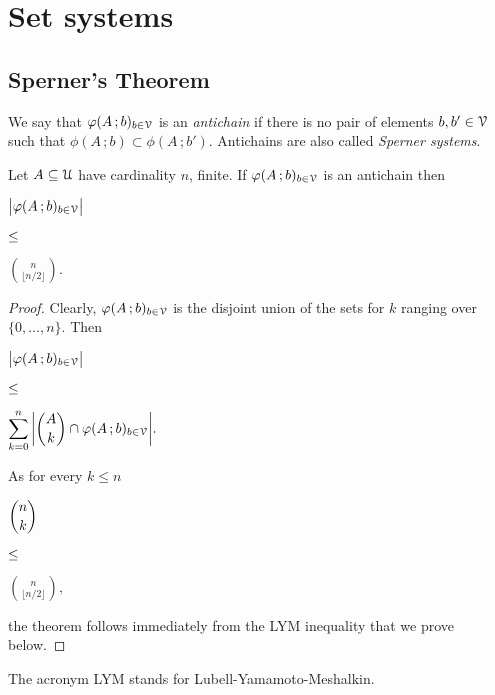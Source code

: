 \documentclass[scombinatorics.tex]{subfiles}
\begin{document}
\chapter{Set systems}
\label{sperner}



\def\medrel#1{\parbox[t]{6ex}{$\displaystyle\hfil #1$}}
\def\ceq#1#2#3{\parbox[t]{40ex}{$\displaystyle #1$}\medrel{#2}{$\displaystyle #3$}}

\def\separatore{\hfil o \rule[0.5ex]{4ex}{0.1ex} o \rule[0.5ex]{4ex}{0.1ex} o}


\section{Sperner's Theorem}\label{sperner}

We say that $\varphi(A\,;b)_{b\in\EuScript V}$ is an \emph{antichain\/} if there is no pair of elements $b,b'\in\EuScript V$ such that $\phi(A\,;b)\subset\phi(A\,;b')$.
Antichains are also called \emph{Sperner systems}.

\def\ceq#1#2#3{\parbox[t]{36ex}{$\displaystyle #1$}\medrel{#2}{$\displaystyle #3$}}

\begin{void_thm}
   Let $A\subseteq\EuScript U$ have cardinality $n$, finite.
   If $\varphi(A\,;b)_{b\in\EuScript V}$ is an antichain then
   
   \ceq{\hfill\big|\phi(A\,;b)_{b\in\V}\big|}{\le}{{n\choose\lfloor n/2\rfloor}.}
\end{void_thm}
\smallskip
\begin{proof}
   Clearly, $\varphi(A\,;b)_{b\in\EuScript V}$ is the disjoint union of the sets  for $k$ ranging over $\{0,\dots,n\}$.
   Then 

   \ceq{\hfill\big|\phi(A\,;b)_{b\in\V}\big|}{\le}{\sum^n_{k=0}\bigg|{A\choose k}\cap\phi(A\,;b)_{b\in\V}\bigg|.}

   As for every $k\le n$
   
   \ceq{\hfill{n\choose k}}{\le}{{n\choose\lfloor n/2\rfloor},}

   the theorem follows immediately from the LYM inequality that we prove below.
\end{proof}

The acronym LYM stands for Lubell-Yamamoto-Meshalkin.
\end{document}
